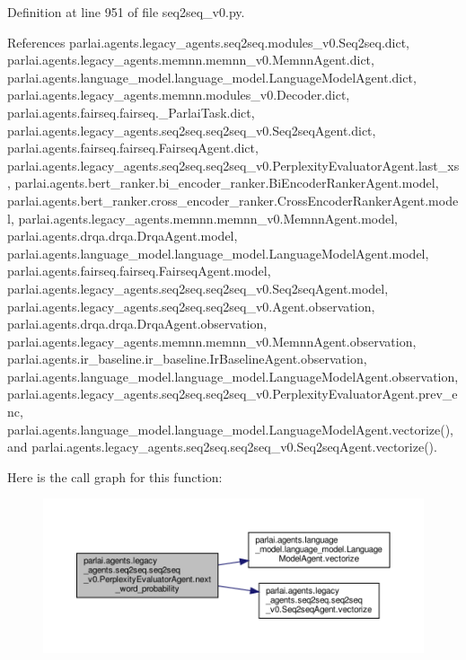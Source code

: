 Definition at line 951 of file seq2seq\+\_\+v0.\+py.



References parlai.\+agents.\+legacy\+\_\+agents.\+seq2seq.\+modules\+\_\+v0.\+Seq2seq.\+dict, parlai.\+agents.\+legacy\+\_\+agents.\+memnn.\+memnn\+\_\+v0.\+Memnn\+Agent.\+dict, parlai.\+agents.\+language\+\_\+model.\+language\+\_\+model.\+Language\+Model\+Agent.\+dict, parlai.\+agents.\+legacy\+\_\+agents.\+memnn.\+modules\+\_\+v0.\+Decoder.\+dict, parlai.\+agents.\+fairseq.\+fairseq.\+\_\+\+Parlai\+Task.\+dict, parlai.\+agents.\+legacy\+\_\+agents.\+seq2seq.\+seq2seq\+\_\+v0.\+Seq2seq\+Agent.\+dict, parlai.\+agents.\+fairseq.\+fairseq.\+Fairseq\+Agent.\+dict, parlai.\+agents.\+legacy\+\_\+agents.\+seq2seq.\+seq2seq\+\_\+v0.\+Perplexity\+Evaluator\+Agent.\+last\+\_\+xs, parlai.\+agents.\+bert\+\_\+ranker.\+bi\+\_\+encoder\+\_\+ranker.\+Bi\+Encoder\+Ranker\+Agent.\+model, parlai.\+agents.\+bert\+\_\+ranker.\+cross\+\_\+encoder\+\_\+ranker.\+Cross\+Encoder\+Ranker\+Agent.\+model, parlai.\+agents.\+legacy\+\_\+agents.\+memnn.\+memnn\+\_\+v0.\+Memnn\+Agent.\+model, parlai.\+agents.\+drqa.\+drqa.\+Drqa\+Agent.\+model, parlai.\+agents.\+language\+\_\+model.\+language\+\_\+model.\+Language\+Model\+Agent.\+model, parlai.\+agents.\+fairseq.\+fairseq.\+Fairseq\+Agent.\+model, parlai.\+agents.\+legacy\+\_\+agents.\+seq2seq.\+seq2seq\+\_\+v0.\+Seq2seq\+Agent.\+model, parlai.\+agents.\+legacy\+\_\+agents.\+seq2seq.\+seq2seq\+\_\+v0.\+Agent.\+observation, parlai.\+agents.\+drqa.\+drqa.\+Drqa\+Agent.\+observation, parlai.\+agents.\+legacy\+\_\+agents.\+memnn.\+memnn\+\_\+v0.\+Memnn\+Agent.\+observation, parlai.\+agents.\+ir\+\_\+baseline.\+ir\+\_\+baseline.\+Ir\+Baseline\+Agent.\+observation, parlai.\+agents.\+language\+\_\+model.\+language\+\_\+model.\+Language\+Model\+Agent.\+observation, parlai.\+agents.\+legacy\+\_\+agents.\+seq2seq.\+seq2seq\+\_\+v0.\+Perplexity\+Evaluator\+Agent.\+prev\+\_\+enc, parlai.\+agents.\+language\+\_\+model.\+language\+\_\+model.\+Language\+Model\+Agent.\+vectorize(), and parlai.\+agents.\+legacy\+\_\+agents.\+seq2seq.\+seq2seq\+\_\+v0.\+Seq2seq\+Agent.\+vectorize().

Here is the call graph for this function\+:
\nopagebreak
\begin{figure}[H]
\begin{center}
\leavevmode
\includegraphics[width=350pt]{classparlai_1_1agents_1_1legacy__agents_1_1seq2seq_1_1seq2seq__v0_1_1PerplexityEvaluatorAgent_ab6f67e52990f7cafdb7fbd2f6215e968_cgraph}
\end{center}
\end{figure}


